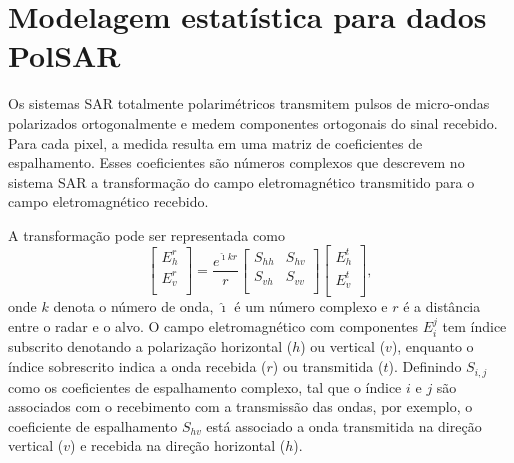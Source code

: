 \documentclass[conference]{IEEEtran}
\begin{document}
\section{Modelagem estatística para dados PolSAR}
Os sistemas SAR totalmente polarimétricos transmitem pulsos de micro-ondas polarizados ortogonalmente e medem componentes ortogonais do sinal recebido. Para cada pixel, a medida resulta em uma matriz de coeficientes de espalhamento. Esses coeficientes são números complexos que descrevem no sistema SAR a transformação do campo eletromagnético transmitido para o campo eletromagnético recebido.

A transformação pode ser representada como
\begin{equation}
 \left[
\begin{array}{c}
	E_{h}^{r}   \\
	E_{v}^{r}    \\
\end{array}
\right]
 = \frac{e^{\hat{\imath} kr}}{r}\left[
\begin{array}{cc}
	S_{hh}   & S_{hv}   \\
	S_{vh}   & S_{vv}   \\
\end{array}
\right]
 \left[
\begin{array}{c}
	E_{h}^{t}   \\
	E_{v}^{t}    \\
\end{array}
\right],
\end{equation}
onde $k$ denota o número de onda, $\hat{\imath}$ é um número complexo e $r$ é a distância entre o radar e o alvo. O campo eletromagnético com componentes $E_{i}^{j}$ tem índice subscrito denotando a polarização horizontal ($h$) ou vertical ($v$),  enquanto o índice sobrescrito indica a onda recebida ($r$) ou transmitida ($t$). Definindo $S_{i,j}$ como os coeficientes de espalhamento complexo, tal que o índice $i$ e $j$ são associados com o recebimento com a transmissão das ondas, por exemplo, o coeficiente de espalhamento $S_{hv}$ está associado a onda transmitida na direção vertical ($v$) e recebida na direção horizontal ($h$).
\end{document}

